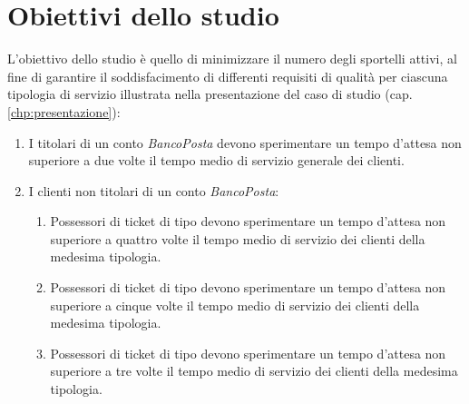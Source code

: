 \chapter{Obiettivi dello studio}\label{chp:obiettivi}
L'obiettivo dello studio è quello di minimizzare il numero degli sportelli attivi, al fine di garantire il soddisfacimento di differenti requisiti di qualità per ciascuna tipologia di servizio illustrata nella presentazione del caso di studio (cap. \ref{chp:presentazione}):

\begin{enumerate}[label=QoS-\arabic*), align=left, leftmargin=*]
\item I titolari di un conto \textsl{BancoPosta} devono sperimentare un tempo d'attesa non superiore a due volte il tempo medio di servizio generale dei clienti.
\item I clienti non titolari di un conto \textsl{BancoPosta}:
\begin{enumerate}
\item Possessori di ticket di tipo \uo{} devono sperimentare un tempo d'attesa non superiore a quattro volte il tempo medio di servizio dei clienti della medesima tipologia.
\item Possessori di ticket di tipo \pp{} devono sperimentare un tempo d'attesa non superiore a cinque volte il tempo medio di servizio dei clienti della medesima tipologia.
\item Possessori di ticket di tipo \sr{} devono sperimentare un tempo d'attesa non superiore a tre volte il tempo medio di servizio dei clienti della medesima tipologia.
\end{enumerate}
\end{enumerate}

